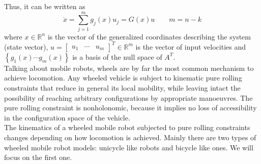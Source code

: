 Thus, it can be written as
\begin{equation} \label{G}
\dot{x}=\sum_{j=1}^{m} g_j(x)u_j=G(x)u \qquad m=n-k
\end{equation}
where $x\in \mathbb{R}^n $ is the vector of the generalized coordinates describing the system (state vector), $u= \left[
\begin{matrix}
u_1 &  \cdots & u_m
\end{matrix}
\right]^T\in\mathbb{R}^m $ is the vector of input velocities and $\left\lbrace  g_1(x) \cdots g_m(x) \right\rbrace $ is a basis of the null space of $A^T$.\\ 
Talking about mobile robots, wheels are by far the most common mechanism to achieve locomotion. Any wheeled vehicle is subject to kinematic pure rolling constraints that reduce in general its local mobility, while leaving intact the possibility of reaching arbitrary configurations by appropriate manoeuvres. The pure rolling constraint is nonholonomic, because it implies no loss of accessibility in the configuration space of the vehicle.\\
The kinematics of a wheeled mobile robot subjected to pure rolling constraints changes depending on how locomotion is achieved. Mainly there are two types of wheeled mobile robot models: unicycle like robots and bicycle like ones. We will focus on the first one.
